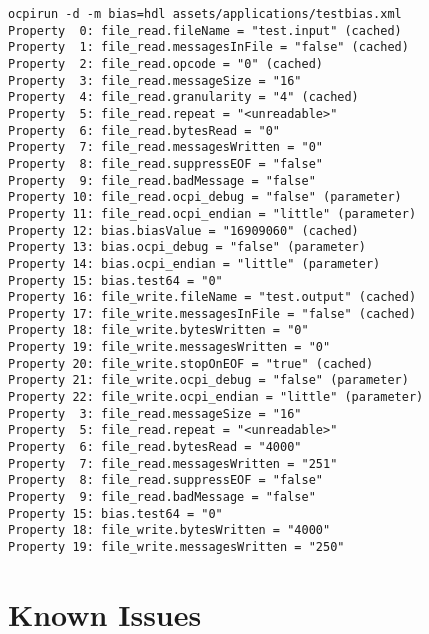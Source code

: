 \documentclass{article}
\begin{document}
\begin{lstlisting}
ocpirun -d -m bias=hdl assets/applications/testbias.xml
Property  0: file_read.fileName = "test.input" (cached)
Property  1: file_read.messagesInFile = "false" (cached)
Property  2: file_read.opcode = "0" (cached)
Property  3: file_read.messageSize = "16"
Property  4: file_read.granularity = "4" (cached)
Property  5: file_read.repeat = "<unreadable>"
Property  6: file_read.bytesRead = "0"
Property  7: file_read.messagesWritten = "0"
Property  8: file_read.suppressEOF = "false"
Property  9: file_read.badMessage = "false"
Property 10: file_read.ocpi_debug = "false" (parameter)
Property 11: file_read.ocpi_endian = "little" (parameter)
Property 12: bias.biasValue = "16909060" (cached)
Property 13: bias.ocpi_debug = "false" (parameter)
Property 14: bias.ocpi_endian = "little" (parameter)
Property 15: bias.test64 = "0"
Property 16: file_write.fileName = "test.output" (cached)
Property 17: file_write.messagesInFile = "false" (cached)
Property 18: file_write.bytesWritten = "0"
Property 19: file_write.messagesWritten = "0"
Property 20: file_write.stopOnEOF = "true" (cached)
Property 21: file_write.ocpi_debug = "false" (parameter)
Property 22: file_write.ocpi_endian = "little" (parameter)
Property  3: file_read.messageSize = "16"
Property  5: file_read.repeat = "<unreadable>"
Property  6: file_read.bytesRead = "4000"
Property  7: file_read.messagesWritten = "251"
Property  8: file_read.suppressEOF = "false"
Property  9: file_read.badMessage = "false"
Property 15: bias.test64 = "0"
Property 18: file_write.bytesWritten = "4000"
Property 19: file_write.messagesWritten = "250"
\end{lstlisting}

\section{Known Issues}
\end{document}
